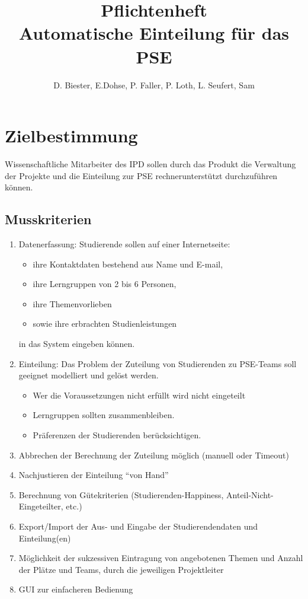 \documentclass[parskip=full]{scrartcl}
\begin{document}
\title{Pflichtenheft \\
        \large Automatische Einteilung für das PSE}

\author{D. Biester, E.Dohse, P. Faller, P. Loth, L. Seufert, Sam}
        
\maketitle
\pagebreak

\tableofcontents
\pagebreak

\section{Zielbestimmung}
Wissenschaftliche Mitarbeiter des IPD sollen durch das Produkt die Verwaltung
der Projekte und die Einteilung zur PSE rechnerunterstützt durchzuführen können.

\subsection{Musskriterien}
 \begin{enumerate}[{M}1]
   \item Datenerfassung: Studierende sollen auf einer Internetseite:   
   \begin{itemize}
     \item ihre Kontaktdaten bestehend aus Name und E-mail,
     \item ihre Lerngruppen von 2 bis 6 Personen,
     \item ihre Themenvorlieben 
     \item sowie ihre erbrachten Studienleistungen 
   \end{itemize}
   in das System eingeben können.
   \item Einteilung: Das Problem der Zuteilung von Studierenden zu PSE-Teams
   soll geeignet modelliert und gelöst werden. 
   \begin{itemize}
     \item Wer die Voraussetzungen nicht erfüllt wird nicht eingeteilt
     \item Lerngruppen sollten zusammenbleiben.
     \item Präferenzen der Studierenden berücksichtigen.
   \end{itemize}
   \item Abbrechen der Berechnung der Zuteilung möglich (manuell oder Timeout)
   \item Nachjustieren der Einteilung “von Hand”
   \item Berechnung von Gütekriterien (Studierenden-Happiness,
   Anteil-Nicht-Eingeteilter, etc.)
   \item Export/Import der Aus- und Eingabe der Studierendendaten und
   Einteilung(en)
   \item Möglichkeit der sukzessiven Eintragung von angebotenen Themen und
   Anzahl der Plätze und Teams, durch die jeweiligen Projektleiter
   \item GUI zur einfacheren Bedienung    
 \end{enumerate}
\end{document}

